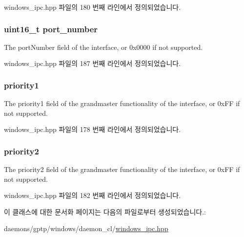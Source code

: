 windows\+\_\+ipc.\+hpp 파일의 180 번째 라인에서 정의되었습니다.

\subsubsection[{\texorpdfstring{port\+\_\+number}{port_number}}]{\setlength{\rightskip}{0pt plus 5cm}uint16\+\_\+t port\+\_\+number}\hypertarget{class_offset_af0afa7bb85d49ac5ff873fad86a48ec5}{}\label{class_offset_af0afa7bb85d49ac5ff873fad86a48ec5}


The port\+Number field of the interface, or 0x0000 if not supported. 



windows\+\_\+ipc.\+hpp 파일의 187 번째 라인에서 정의되었습니다.

\subsubsection[{\texorpdfstring{priority1}{priority1}}]{ priority1}\hypertarget{class_offset_af98f08e3d1b016cd549310197ba8673c}{}\label{class_offset_af98f08e3d1b016cd549310197ba8673c}


The priority1 field of the grandmaster functionality of the interface, or 0x\+FF if not supported. 



windows\+\_\+ipc.\+hpp 파일의 178 번째 라인에서 정의되었습니다.

\subsubsection[{\texorpdfstring{priority2}{priority2}}]{ priority2}\hypertarget{class_offset_ac04b889463a96b43985cb82020e3c39b}{}\label{class_offset_ac04b889463a96b43985cb82020e3c39b}


The priority2 field of the grandmaster functionality of the interface, or 0x\+FF if not supported. 



windows\+\_\+ipc.\+hpp 파일의 182 번째 라인에서 정의되었습니다.



이 클래스에 대한 문서화 페이지는 다음의 파일로부터 생성되었습니다.\+:\begin{DoxyCompactItemize}
\item 
daemons/gptp/windows/daemon\+\_\+cl/\hyperlink{windows__ipc_8hpp}{windows\+\_\+ipc.\+hpp}\end{DoxyCompactItemize}

